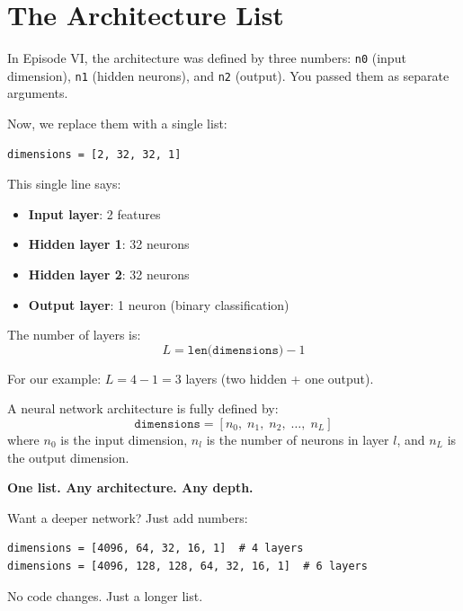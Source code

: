 \documentclass[11pt]{article}
\begin{document}
\section{The Architecture List}

In Episode VI, the architecture was defined by three numbers: \texttt{n0} (input dimension), \texttt{n1} (hidden neurons), and \texttt{n2} (output). You passed them as separate arguments.

Now, we replace them with a single list:

\begin{lstlisting}
dimensions = [2, 32, 32, 1]
\end{lstlisting}

This single line says:
\begin{itemize}
  \item \textbf{Input layer}: 2 features
  \item \textbf{Hidden layer 1}: 32 neurons
  \item \textbf{Hidden layer 2}: 32 neurons
  \item \textbf{Output layer}: 1 neuron (binary classification)
\end{itemize}

The number of layers is:
$$L = \texttt{len(dimensions)} - 1$$

For our example: $L = 4 - 1 = 3$ layers (two hidden + one output).

\begin{defbox}[title=The Dimensions List]
A neural network architecture is fully defined by:
$$\texttt{dimensions} = [n_0, \; n_1, \; n_2, \; \dots, \; n_L]$$
where $n_0$ is the input dimension, $n_l$ is the number of neurons in layer $l$, and $n_L$ is the output dimension.

\textbf{One list. Any architecture. Any depth.}
\end{defbox}

Want a deeper network? Just add numbers:

\begin{lstlisting}
dimensions = [4096, 64, 32, 16, 1]  # 4 layers
dimensions = [4096, 128, 128, 64, 32, 16, 1]  # 6 layers
\end{lstlisting}

No code changes. Just a longer list.
\end{document}
